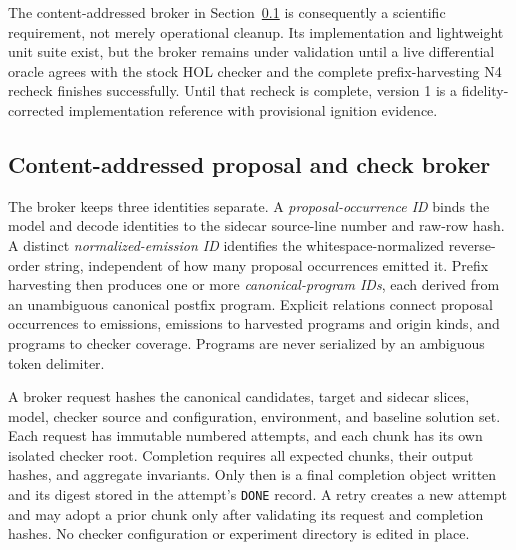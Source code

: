 \documentclass[11pt]{article}
\begin{document}
The content-addressed broker in Section~\ref{sec:broker} is consequently a scientific
requirement, not merely operational cleanup.  Its implementation and lightweight unit
suite exist, but the broker remains under validation until a live differential oracle
agrees with the stock HOL checker and the complete prefix-harvesting N4 recheck finishes
successfully.  Until that recheck is complete, version 1 is a fidelity-corrected implementation reference
with provisional ignition evidence.

\subsection{Content-addressed proposal and check broker}
\label{sec:broker}

The broker keeps three identities separate.  A \emph{proposal-occurrence ID} binds the
model and decode identities to the sidecar source-line number and raw-row hash.  A distinct
\emph{normalized-emission ID} identifies the whitespace-normalized reverse-order string,
independent of how many proposal occurrences emitted it.  Prefix harvesting then produces
one or more \emph{canonical-program IDs}, each derived from an unambiguous canonical
postfix program.  Explicit relations connect proposal occurrences to emissions, emissions
to harvested programs and origin kinds, and programs to checker coverage.  Programs are
never serialized by an ambiguous token delimiter.

A broker request hashes the canonical candidates, target and sidecar slices, model,
checker source and configuration, environment, and baseline solution set.  Each request
has immutable numbered attempts, and each chunk has its own isolated checker root.
Completion requires all expected chunks, their output hashes, and aggregate invariants.
Only then is a final completion object written and its digest stored in the attempt's
\texttt{DONE} record.  A retry creates a new attempt and may adopt a prior chunk only after
validating its request and completion hashes.  No checker configuration or experiment
directory is edited in place.
\end{document}

